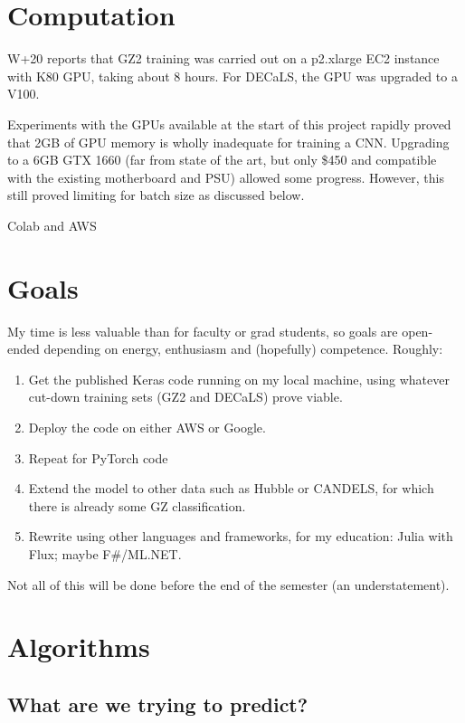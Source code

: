 \documentclass[preprint]{aastex63}
\newcommand{\todo}{\color{red}{TODO}\color{black}\hspace{2mm}}
\begin{document}
\section{Computation} \label{sec:comp}

W+20 reports that GZ2 training was carried out on a p2.xlarge EC2 instance with K80 GPU, taking about 8 hours. For DECaLS, the GPU was upgraded to a V100.

Experiments with the GPUs available at the start of this project rapidly proved that 2GB of GPU memory is wholly inadequate for training a CNN. Upgrading to a 6GB GTX 1660 (far from state of the art, but only \$450 and compatible with the existing motherboard and PSU) allowed some progress. However, this still proved limiting for batch size as discussed below.

\todo Colab and AWS


\section{Goals} \label{sec:goals}

My time is less valuable than for faculty or grad students, so goals are open-ended depending on energy, enthusiasm and (hopefully) competence. Roughly:
\begin{enumerate}
	\item Get the published Keras code running on my local machine, using whatever cut-down training sets (GZ2 and DECaLS) prove viable.
	\item Deploy the code on either AWS or Google.
	\item Repeat for PyTorch code
	\item Extend the model to other data such as Hubble or CANDELS, for which there is already some GZ classification.
	\item Rewrite using other languages and frameworks, for my education: Julia with Flux; maybe F\#/ML.NET.
\end{enumerate}

Not all of this will be done before the end of the semester (an understatement).

\section{Algorithms} \label{algorithms}

\subsection{What are we trying to predict?}
\end{document}
